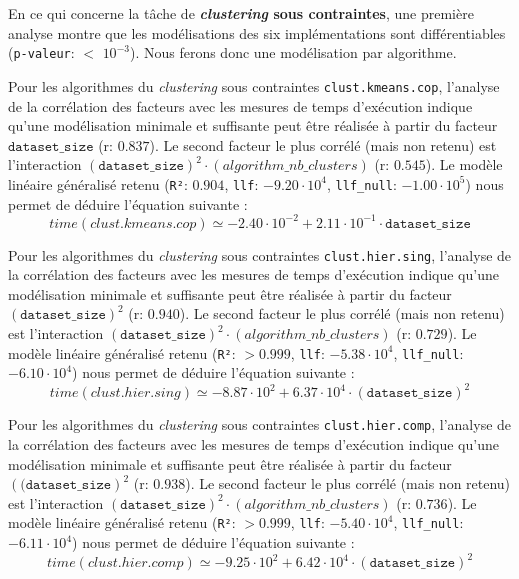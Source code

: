 			
			En ce qui concerne la tâche de \textbf{\textit{clustering} sous contraintes}, une première analyse montre que les modélisations des six implémentations sont différentiables  (\texttt{p-valeur}: $<$ \texttt{$10^{-3}$}). Nous ferons donc une modélisation par algorithme.
			
			Pour les algorithmes du \textit{clustering} sous contraintes \texttt{clust.kmeans.cop}, l'analyse de la corrélation des facteurs avec les mesures de temps d'exécution indique qu'une modélisation minimale et suffisante peut être réalisée à partir du facteur $\texttt{dataset\_size}$ (r: $0.837$).
			Le second facteur le plus corrélé (mais non retenu) est l'interaction $(\texttt{dataset\_size})^{2}\cdot(algorithm\_nb\_clusters)$ (r: $0.545$).
			Le modèle linéaire généralisé retenu (\texttt{R²}: $0.904$, \texttt{llf}: $-9.20\cdot10^{4}$, \texttt{llf\_null}: $-1.00\cdot10^{5}$) nous permet de déduire l'équation suivante :
			\begin{equation}
				time(clust.kmeans.cop)
				\simeq -2.40\cdot10^{-2} + 2.11\cdot10^{-1}\cdot\texttt{dataset\_size}
			\end{equation}
			
			Pour les algorithmes du \textit{clustering} sous contraintes \texttt{clust.hier.sing}, l'analyse de la corrélation des facteurs avec les mesures de temps d'exécution indique qu'une modélisation minimale et suffisante peut être réalisée à partir du facteur $(\texttt{dataset\_size})^{2}$ (r: $0.940$).
			Le second facteur le plus corrélé (mais non retenu) est l'interaction $(\texttt{dataset\_size})^{2}\cdot(algorithm\_nb\_clusters)$ (r: $0.729$).
			Le modèle linéaire généralisé retenu (\texttt{R²}: $> 0.999$, \texttt{llf}: $-5.38\cdot10^{4}$, \texttt{llf\_null}: $-6.10\cdot10^{4}$) nous permet de déduire l'équation suivante :
			\begin{equation}
				time(clust.hier.sing)
				\simeq -8.87\cdot10^{2} + 6.37\cdot10^{4}\cdot(\texttt{dataset\_size})^{2}
			\end{equation}
			
			Pour les algorithmes du \textit{clustering} sous contraintes \texttt{clust.hier.comp}, l'analyse de la corrélation des facteurs avec les mesures de temps d'exécution indique qu'une modélisation minimale et suffisante peut être réalisée à partir du facteur $(\texttt{(dataset\_size})^{2}$ (r: $0.938$).
			Le second facteur le plus corrélé (mais non retenu) est l'interaction $(\texttt{dataset\_size})^{2}\cdot(algorithm\_nb\_clusters)$ (r: $0.736$).
			Le modèle linéaire généralisé retenu (\texttt{R²}: $> 0.999$, \texttt{llf}: $-5.40\cdot10^{4}$, \texttt{llf\_null}: $-6.11\cdot10^{4}$) nous permet de déduire l'équation suivante :
			\begin{equation}
				time(clust.hier.comp)
				\simeq -9.25\cdot10^{2} + 6.42\cdot10^{4}\cdot(\texttt{dataset\_size})^{2}
			\end{equation}

